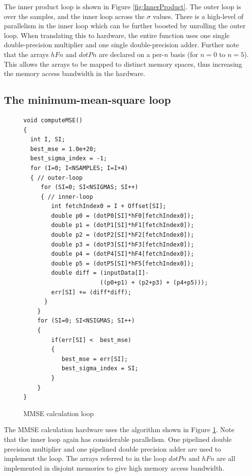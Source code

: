 \documentclass[conference]{IEEEtran}
\begin{document}
The inner product loop is shown in Figure \ref{fig:InnerProduct}.
The outer loop is over the samples, and the inner
loop across the $\sigma$ values.  There is a high-level
of parallelism in the inner loop which can be further
boosted by unrolling the outer loop.   When translating
this to hardware, the entire function uses one single double-precision
multiplier and one single double-precision adder.  Further
note that the arrays $hFn$ and $dotPn$ are declared on
a per-$n$ basis (for $n=0$ to $n=5$). This allows the arrays to be mapped to
distinct memory spaces, thus increasing the memory access bandwidth in the hardware.

\subsection{The minimum-mean-square loop} \label{sec:MMSE}

\begin{figure}
\begin{centering}
\footnotesize\begin{verbatim}
void computeMSE()
{
  int I, SI;
  best_mse = 1.0e+20;
  best_sigma_index = -1;
  for (I=0; I<NSAMPLES; I=I+4)
  { // outer-loop
     for (SI=0; SI<NSIGMAS; SI++)
     { // inner-loop
        int fetchIndex0 = I + Offset[SI]; 
        double p0 = (dotP0[SI]*hF0[fetchIndex0]);
        double p1 = (dotP1[SI]*hF1[fetchIndex0]);
        double p2 = (dotP2[SI]*hF2[fetchIndex0]);
        double p3 = (dotP3[SI]*hF3[fetchIndex0]);
        double p4 = (dotP4[SI]*hF4[fetchIndex0]);
        double p5 = (dotP5[SI]*hF5[fetchIndex0]);
        double diff = (inputData[I]-
                      ((p0+p1) + (p2+p3) + (p4+p5)));
        err[SI] += (diff*diff);
      }
    }
    for (SI=0; SI<NSIGMAS; SI++)
    {
        if(err[SI] <  best_mse)
        {
           best_mse = err[SI];
           best_sigma_index = SI;
        }
    }
}
\end{verbatim}
\normalsize
\end{centering}
\caption{MMSE calculation loop}
\label{fig:MMSE}
\end{figure}


The MMSE calculation hardware
uses the algorithm shown in Figure \ref{fig:MMSE}.
Note that the inner loop again has considerable parallelism.
One pipelined double precision multiplier and one
pipelined double precision adder are used to implement
the loop.  The arrays referred to in the loop
$dotPn$ and $hFn$ are all implemented in disjoint
memories to give high memory access bandwidth.
\end{document}
